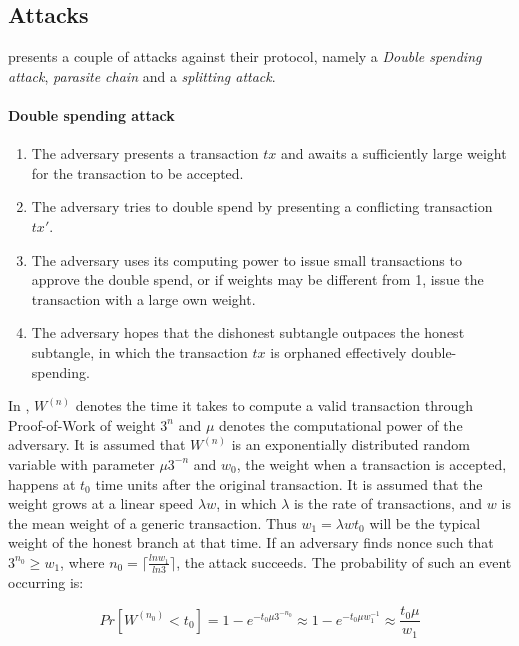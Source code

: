 \subsection{Attacks}
\cite{tangle} presents a couple of attacks against their protocol, namely a \emph{Double spending attack}, \emph{parasite chain} and a \emph{splitting attack}.

\paragraph{Double spending attack}
\begin{enumerate}
    \item The adversary presents a transaction $tx$ and awaits a sufficiently large weight for the transaction to be accepted.
    \item The adversary tries to double spend by presenting a conflicting transaction $tx'$.
    \item The adversary uses its computing power to issue small transactions to approve the double spend, or if weights may be different from 1, issue the transaction with a large own weight.
    \item The adversary hopes that the dishonest subtangle outpaces the honest subtangle, in which the transaction $tx$ is orphaned effectively double-spending.
\end{enumerate}

In \cite{tangle}, $W^{(n)}$ denotes the time it takes to compute a valid transaction through Proof-of-Work of weight $3^n$ and $\mu$ denotes the computational power of the adversary. It is assumed that $W^{(n)}$ is an exponentially distributed random variable with parameter $\mu 3^{-n}$ and $w_0$, the weight when a transaction is accepted, happens at $t_0$ time units after the original transaction. It is assumed that the weight grows at a linear speed $\lambda w$, in which $\lambda$ is the rate of transactions, and $w$ is the mean weight of a generic transaction. Thus $w_1 = \lambda w t_0$ will be the typical weight of the honest branch at that time. If an adversary finds nonce such that $3^{n_0} \geq w_1$, where $n_0 = \lceil \frac{ln w_1}{ln 3} \rceil$, the attack succeeds. The probability of such an event occurring is:

\begin{equation*}
    Pr[W^{(n_0)} < t_0] = 1 - e^{-t_0 \mu 3^{-n_0}} \approx 1 - e^{-t_0 \mu w_1^{-1}} \approx \frac{t_0 \mu}{w_1}
\end{equation*}

